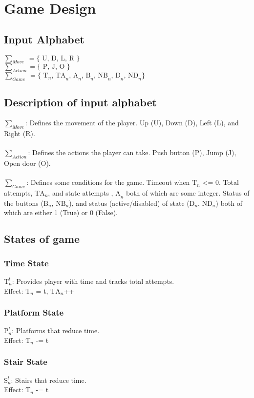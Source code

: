 \documentclass[10pt]{article}
\begin{document}
\section*{Game Design}
\subsection*{Input Alphabet}
$\sum_{Move} \; = \{\text{ U, D, L, R }\}$ \\
$\sum_{Action} = \{\text{ P, J, O }\}$ \\
$\sum_{Game} \; = \{\text{ T}_{n} \text{, TA}_{n} \text{, A}_{n} \text{, B}_{n} \text{, NB}_{n} \text{, D}_{n} \text{, ND}_{n} \}$
\subsection*{Description of input alphabet}
$\sum_{Move}$: Defines the movement of the player. Up (U), Down (D), Left (L), and Right (R). \\\\
$\sum_{Action}$: Defines the actions the player can take. Push button (P), Jump (J), Open door (O). \\\\
$\sum_{Game}$: Defines some conditions for the game. Timeout when $\text{T}_{n}$ <= 0. Total attempts, $\text{TA}_{n}$, and state attempts $\text{, A}_{n}$ both of which are some integer. Status of the buttons ($\text{B}_{n}$, $\text{NB}_{n}$), and status (active/disabled) of state ($\text{D}_{n}$, $\text{ND}_{n}$) both of which are either 1 (True) or 0 (False).
\subsection*{States of game}
\subsubsection*{Time State}
$\text{T}_{n}^{t}$: Provides player with time and tracks total attempts. \\
Effect: $\text{T}_{n}$ = t, $\text{TA}_{n}$++

\subsubsection*{Platform State}
$\text{P}_{n}^{t}$: Platforms that reduce time. \\
Effect: $\text{T}_{n}$ -= t

\subsubsection*{Stair State}
$\text{S}_{n}^{t}$: Stairs that reduce time. \\
Effect: $\text{T}_{n}$ -= t
\end{document}
